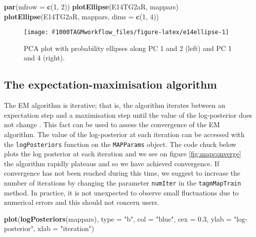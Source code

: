 \documentclass[9pt,a4paper,]{extarticle}
\newenvironment{Shaded}{\begin{snugshade}}{\end{snugshade}}
\newcommand{\DataTypeTok}[1]{\textcolor[rgb]{0.13,0.29,0.53}{#1}}
\newcommand{\DecValTok}[1]{\textcolor[rgb]{0.00,0.00,0.81}{#1}}
\newcommand{\FloatTok}[1]{\textcolor[rgb]{0.00,0.00,0.81}{#1}}
\newcommand{\KeywordTok}[1]{\textcolor[rgb]{0.13,0.29,0.53}{\textbf{#1}}}
\newcommand{\NormalTok}[1]{#1}
\newcommand{\StringTok}[1]{\textcolor[rgb]{0.31,0.60,0.02}{#1}}
\begin{document}
\begin{Shaded}
\begin{Highlighting}[]
\KeywordTok{par}\NormalTok{(}\DataTypeTok{mfrow =} \KeywordTok{c}\NormalTok{(}\DecValTok{1}\NormalTok{, }\DecValTok{2}\NormalTok{))}
\KeywordTok{plotEllipse}\NormalTok{(E14TG2aR, mappars)}
\KeywordTok{plotEllipse}\NormalTok{(E14TG2aR, mappars, }\DataTypeTok{dims =} \KeywordTok{c}\NormalTok{(}\DecValTok{1}\NormalTok{, }\DecValTok{4}\NormalTok{))}
\end{Highlighting}
\end{Shaded}

\begin{figure}

{\centering \texttt{[image: F1000TAGMworkflow\_files/figure-latex/e14ellipse-1]} 

}

\caption{PCA plot with probability ellipses along PC 1 and 2 (left) and PC 1 and 4 (right).}\label{fig:e14ellipse}
\end{figure}

\hypertarget{the-expectation-maximisation-algorithm}{%
\subsection{The expectation-maximisation algorithm}\label{the-expectation-maximisation-algorithm}}

The EM algorithm is iterative; that is, the algorithm iterates between
an expectation step and a maximisation step until the value of the
log-posterior does not change \citep{EM:1977}. This fact can be used to
assess the convergence of the EM algorithm. The value of the
log-posterior at each iteration can be accessed with the
\texttt{logPosteriors} function on the \texttt{MAPParams} object. The code chuck
below plots the log posterior at each iteration and we see on figure
\ref{fig:mapconverge} the algorithm rapidly plateaus and so we have
achieved convergence. If convergence has not been reached during this
time, we suggest to increase the number of iterations by changing the
parameter \texttt{numIter} in the \texttt{tagmMapTrain} method. In practice, it is not
unexpected to observe small fluctuations due to numerical errors and
this should not concern users.

\begin{Shaded}
\begin{Highlighting}[]
\KeywordTok{plot}\NormalTok{(}\KeywordTok{logPosteriors}\NormalTok{(mappars), }\DataTypeTok{type =} \StringTok{"b"}\NormalTok{, }\DataTypeTok{col =} \StringTok{"blue"}\NormalTok{,}
     \DataTypeTok{cex =} \FloatTok{0.3}\NormalTok{, }\DataTypeTok{ylab =} \StringTok{"log-posterior"}\NormalTok{, }\DataTypeTok{xlab =} \StringTok{"iteration"}\NormalTok{)}
\end{Highlighting}
\end{Shaded}
\end{document}
